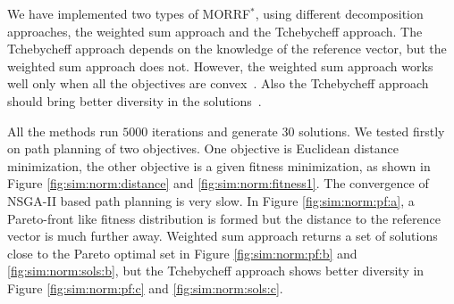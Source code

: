 \documentclass[conference]{IEEEtran}
\begin{document}
We have implemented two types of  MORRF$^{*}$, using different decomposition approaches, the weighted sum approach and the Tchebycheff approach.
The Tchebycheff approach depends on the knowledge of the reference vector, but the weighted sum approach does not.
However, the weighted sum approach works well only when all the objectives are convex~\cite{4358754}.
Also the Tchebycheff approach should bring better diversity in the solutions~\cite{4358754}.

All the methods run $ 5000 $ iterations and generate $ 30 $ solutions.
We tested firstly on path planning of two objectives.
One objective is  Euclidean distance minimization, the other objective is a given fitness minimization, as shown in Figure \ref{fig:sim:norm:distance} and \ref{fig:sim:norm:fitness1}.
The convergence of NSGA-II based path planning is very slow.
In Figure \ref{fig:sim:norm:pf:a}, a Pareto-front like fitness distribution is formed but the distance to the reference vector is much further away.
Weighted sum approach returns a set of solutions close to the Pareto optimal set in Figure \ref{fig:sim:norm:pf:b} and \ref{fig:sim:norm:sols:b}, but the Tchebycheff approach shows better diversity in Figure \ref{fig:sim:norm:pf:c} and \ref{fig:sim:norm:sols:c}.
\end{document}
